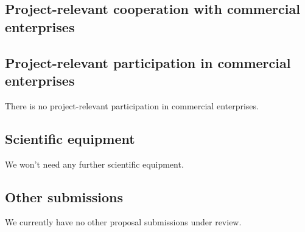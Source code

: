 
\subsection{Project-relevant cooperation with commercial enterprises}



\subsection{Project-relevant participation in commercial enterprises}

There is no project-relevant participation in commercial enterprises.  

\subsection{Scientific equipment}

We won't need any further scientific equipment. 

\subsection{Other submissions}

We currently have no other proposal submissions under review.  